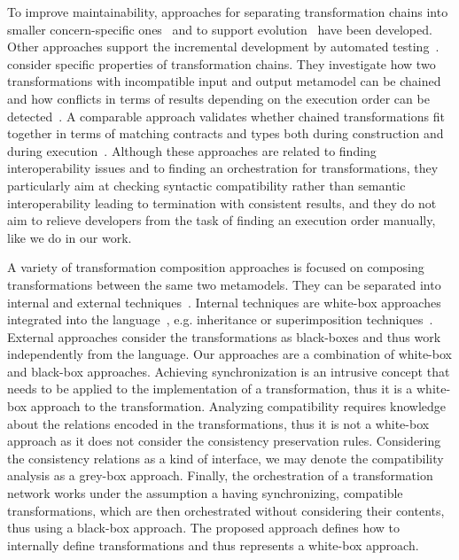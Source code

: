 To improve maintainability, approaches for separating transformation chains into smaller concern-specific ones~\cite{yie2012a} and to support evolution~\cite{yie2009a} have been developed.
Other approaches support the incremental development by automated testing~\cite{kuester2009incremetalChainDevelopment-MODELS}.
 consider specific properties of transformation chains.
They investigate how two transformations with incompatible input and output metamodel can be chained~\cite{etien2010Combining-SAC} and how conflicts in terms of results depending on the execution order can be detected~\cite{etien2012Chaining-AMT}.
A comparable approach validates whether chained transformations fit together in terms of matching contracts and types both during construction and during execution~\cite{heidenreich2010compositionTransformations-ICMT}.
Although these approaches are related to finding interoperability issues and to finding an orchestration for transformations, they particularly aim at checking syntactic compatibility rather than semantic interoperability leading to termination with consistent results, and they do not aim to relieve developers from the task of finding an execution order manually, like we do in our work.

A variety of transformation composition approaches is focused on composing transformations between the same two metamodels.
They can be separated into internal and external techniques~\cite{wagelaar2008a}.
Internal techniques are white-box approaches integrated into the language~\cite{wagelaar2011a}, e.g. inheritance or superimposition techniques~\cite{wagelaar2010a}.
External approaches consider the transformations as black-boxes and thus work independently from the language. 
Our approaches are a combination of white-box and black-box approaches.
Achieving synchronization is an intrusive concept that needs to be applied to the implementation of a transformation, thus it is a white-box approach to the transformation.
Analyzing compatibility requires knowledge about the relations encoded in the transformations, thus it is not a white-box approach as it does not consider the consistency preservation rules. Considering the consistency relations as a kind of interface, we may denote the compatibility analysis as a grey-box approach.
Finally, the orchestration of a transformation network works under the assumption a having synchronizing, compatible transformations, which are then orchestrated without considering their contents, thus using a black-box approach.
The proposed \commonalities approach defines how to internally define transformations and thus represents a white-box approach.

